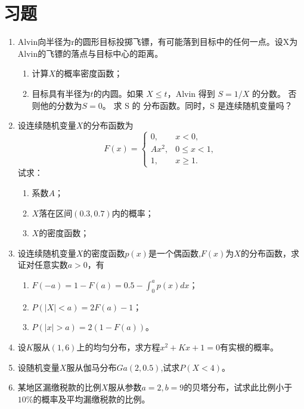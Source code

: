    \section{习题}

        \begin{enumerate}
            \item Alvin向半径为r的圆形目标投掷飞镖，有可能落到目标中的任何一点。设X为Alvin的飞镖的落点与目标中心的距离。
            \begin{enumerate}
                \item 计算$X$的概率密度函数；
\item 目标具有半径为$t$的内圆。如果 $X\leq t$，Alvin 得到 $S = 1/X$ 的分数。 否则他的分数为$S = 0$。 求 S 的 分布函数。同时，S 是连续随机变量吗？
            \end{enumerate}
\item 设连续随机变量$X$的分布函数为
$$
F(x) = \left\{\begin{matrix}0, & x<0,\\
    	Ax^2, & 0\leq x < 1,\\
    	1, & x \geq 1.
    	\end{matrix}
    	 \right.
$$
试求：
\begin{enumerate}
    \item 系数$A$；
    \item $X$落在区间$(0.3,0.7)$内的概率；
\item $X$的密度函数；
\end{enumerate}

\item 设连续随机变量$X$的密度函数$p(x)$是一个偶函数,$F(x)$为$X$的分布函数，求证对任意实数$a > 0$，有
\begin{enumerate}
    \item $F(-a) = 1- F(a) = 0.5-\int_0^a p(x)dx$；
\item  $P(|X| < a) = 2F(a)-1$；
\item  $P(|x| > a) = 2(1-F(a))$。
\end{enumerate}

\item  设$K$服从$(1,6)$上的均匀分布，求方程$x^2 + Kx +1 = 0$有实根的概率。

\item 设随机变量$X$服从伽马分布$Ga(2,0.5)$,试求$P(X < 4)$。

\item  某地区漏缴税款的比例$X$服从参数$a=2,b=9$的贝塔分布，试求此比例小于$10\%$的概率及平均漏缴税款的比例。


\end{enumerate}
